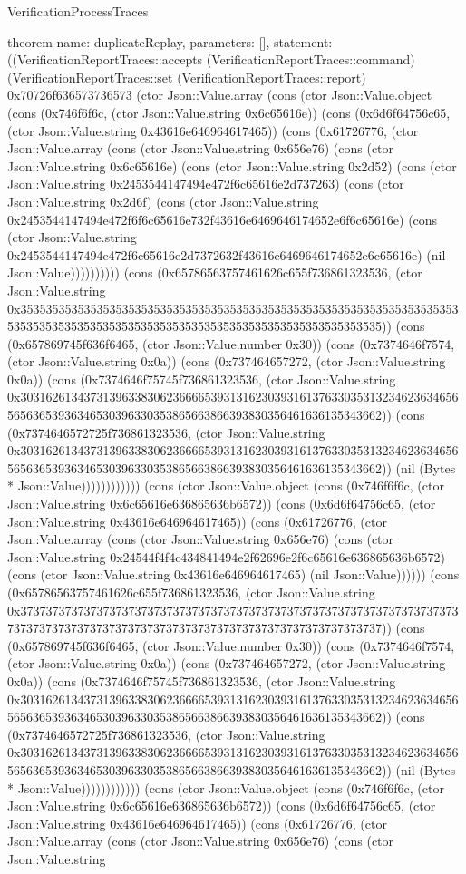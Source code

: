 \begin{lexlean}{VerificationProcessTraces}
\begin{semanticmodule}
theorem{
  name: duplicateReplay,
  parameters: [],
  statement: ((VerificationReportTraces::accepts (VerificationReportTraces::command) (VerificationReportTraces::set (VerificationReportTraces::report) 0x70726f636573736573 (ctor Json::Value.array (cons (ctor Json::Value.object (cons (0x746f6f6c, (ctor Json::Value.string 0x6c65616e)) (cons (0x6d6f64756c65, (ctor Json::Value.string 0x43616e646964617465)) (cons (0x61726776, (ctor Json::Value.array (cons (ctor Json::Value.string 0x656e76) (cons (ctor Json::Value.string 0x6c65616e) (cons (ctor Json::Value.string 0x2d52) (cons (ctor Json::Value.string 0x2453544147494e472f6c65616e2d737263) (cons (ctor Json::Value.string 0x2d6f) (cons (ctor Json::Value.string 0x2453544147494e472f6f6c65616e732f43616e6469646174652e6f6c65616e) (cons (ctor Json::Value.string 0x2453544147494e472f6c65616e2d7372632f43616e6469646174652e6c65616e) (nil Json::Value)))))))))) (cons (0x65786563757461626c655f736861323536, (ctor Json::Value.string 0x35353535353535353535353535353535353535353535353535353535353535353535353535353535353535353535353535353535353535353535353535353535)) (cons (0x657869745f636f6465, (ctor Json::Value.number 0x30)) (cons (0x7374646f7574, (ctor Json::Value.string 0x0a)) (cons (0x737464657272, (ctor Json::Value.string 0x0a)) (cons (0x7374646f75745f736861323536, (ctor Json::Value.string 0x30316261343731396338306236666539313162303931613763303531323462363465656563653936346530396330353865663866393830356461636135343662)) (cons (0x7374646572725f736861323536, (ctor Json::Value.string 0x30316261343731396338306236666539313162303931613763303531323462363465656563653936346530396330353865663866393830356461636135343662)) (nil (Bytes * Json::Value)))))))))))) (cons (ctor Json::Value.object (cons (0x746f6f6c, (ctor Json::Value.string 0x6c65616e636865636b6572)) (cons (0x6d6f64756c65, (ctor Json::Value.string 0x43616e646964617465)) (cons (0x61726776, (ctor Json::Value.array (cons (ctor Json::Value.string 0x656e76) (cons (ctor Json::Value.string 0x24544f4f4c434841494e2f62696e2f6c65616e636865636b6572) (cons (ctor Json::Value.string 0x43616e646964617465) (nil Json::Value)))))) (cons (0x65786563757461626c655f736861323536, (ctor Json::Value.string 0x37373737373737373737373737373737373737373737373737373737373737373737373737373737373737373737373737373737373737373737373737373737)) (cons (0x657869745f636f6465, (ctor Json::Value.number 0x30)) (cons (0x7374646f7574, (ctor Json::Value.string 0x0a)) (cons (0x737464657272, (ctor Json::Value.string 0x0a)) (cons (0x7374646f75745f736861323536, (ctor Json::Value.string 0x30316261343731396338306236666539313162303931613763303531323462363465656563653936346530396330353865663866393830356461636135343662)) (cons (0x7374646572725f736861323536, (ctor Json::Value.string 0x30316261343731396338306236666539313162303931613763303531323462363465656563653936346530396330353865663866393830356461636135343662)) (nil (Bytes * Json::Value)))))))))))) (cons (ctor Json::Value.object (cons (0x746f6f6c, (ctor Json::Value.string 0x6c65616e636865636b6572)) (cons (0x6d6f64756c65, (ctor Json::Value.string 0x43616e646964617465)) (cons (0x61726776, (ctor Json::Value.array (cons (ctor Json::Value.string 0x656e76) (cons (ctor Json::Value.string }
\end{semanticmodule}
\end{lexlean}
